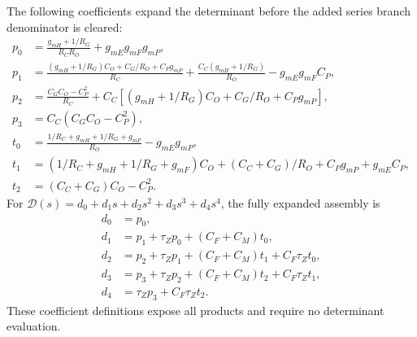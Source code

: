 The following coefficients expand the determinant before the added series branch denominator is cleared:
\begin{align}
 p_0&=\frac{g_{mH}+1/R_G}{R_CR_O}+g_{mE}g_{mF}g_{mP},\\
 p_1&=\frac{(g_{mH}+1/R_G)C_O+C_G/R_O+C_Pg_{mP}}{R_C}
       +\frac{C_C(g_{mH}+1/R_G)}{R_O}-g_{mE}g_{mF}C_P,\\
 p_2&=\frac{C_GC_O-C_P^2}{R_C}
       +C_C\left[(g_{mH}+1/R_G)C_O+C_G/R_O+C_Pg_{mP}\right],\\
 p_3&=C_C(C_GC_O-C_P^2),\\
 t_0&=\frac{1/R_C+g_{mH}+1/R_G+g_{mF}}{R_O}-g_{mE}g_{mP},\\
 t_1&=(1/R_C+g_{mH}+1/R_G+g_{mF})C_O+(C_C+C_G)/R_O+C_Pg_{mP}+g_{mE}C_P,\\
 t_2&=(C_C+C_G)C_O-C_P^2.
\end{align}
For $\mathcal D(s)=d_0+d_1s+d_2s^2+d_3s^3+d_4s^4$, the fully expanded assembly is
\begin{align}
 d_0&=p_0,\\
 d_1&=p_1+\tau_Zp_0+(C_F+C_M)t_0,\\
 d_2&=p_2+\tau_Zp_1+(C_F+C_M)t_1+C_F\tau_Zt_0,\\
 d_3&=p_3+\tau_Zp_2+(C_F+C_M)t_2+C_F\tau_Zt_1,\\
 d_4&=\tau_Zp_3+C_F\tau_Zt_2.
\end{align}
These coefficient definitions expose all products and require no determinant evaluation.

